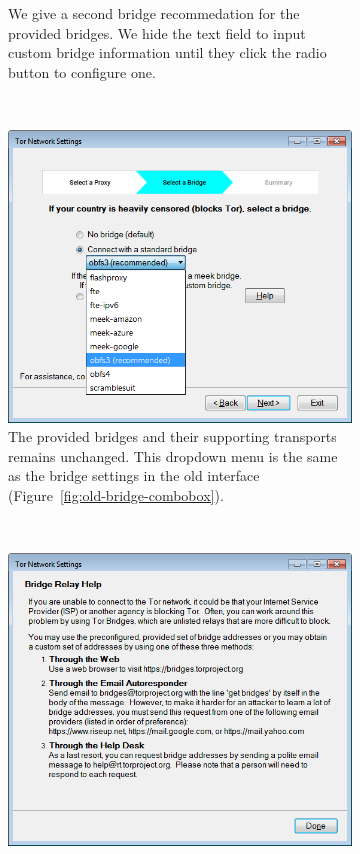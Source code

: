 \documentclass[USenglish,oneside,twocolumn]{article}
\begin{document}
\begin{figure}
\begin{subfigure}[b]{0.30\textwidth}
	\centering\captionsetup{width=1.5\linewidth}%
	\caption{We give a second bridge recommedation for the provided bridges. We hide the text field to input custom bridge information until they click the radio button to configure one.}
	\label{fig:new-bridge}
\end{subfigure}
~~~~~~~~~~
\begin{subfigure}[b]{0.30\textwidth}
	\includegraphics[width=\textwidth]{screenshots/NEW-bridgeSettings-combobox.png}
	\centering\captionsetup{width=1.5\linewidth}%
	\caption{The provided bridges and their supporting transports remains unchanged. This dropdown menu is the same as the bridge settings in the old interface (Figure~\ref{fig:old-bridge-combobox}).}
	\label{fig:new-bridge-combobox}
\end{subfigure}
~~~~~~~~~~~~~~~~~~~~~~~~~
\begin{subfigure}[b]{0.30\textwidth}
	\includegraphics[width=\textwidth]{screenshots/NEW-bridgeHelp.png}

\end{subfigure}
\end{figure}
\end{document}
